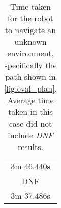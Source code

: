 \begin{appendices}
\begin{table}[!h]
\begin{tabular}{ c }
		$3$m $46.440$s \\

		DNF \\

		\midrule
		$3$m $37.486$s \\
		\bottomrule
	\end{tabular}
	\caption{Time taken for the robot to navigate an unknown environment, specifically the path shown in \autoref{fig:eval_plan}. Average time taken in this case did not include \emph{DNF} results.}
	\label{tab:eval_nav_cp_unknown}
\end{table}

\end{appendices}